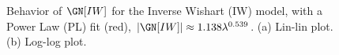 \begin{figure}[t]
  \centering
    \caption{Behavior of $\GN[IW]$ for the Inverse Wishart (IW) model,
       with a Power Law (PL) fit (red), $|\GN[IW]|\approx 1.138 \lambda^{0.539}$.
      (a)  Lin-lin plot. (b) Log-log plot.
}
    \label{fig:InverseWishartGx}
\end{figure}

%
%
%



